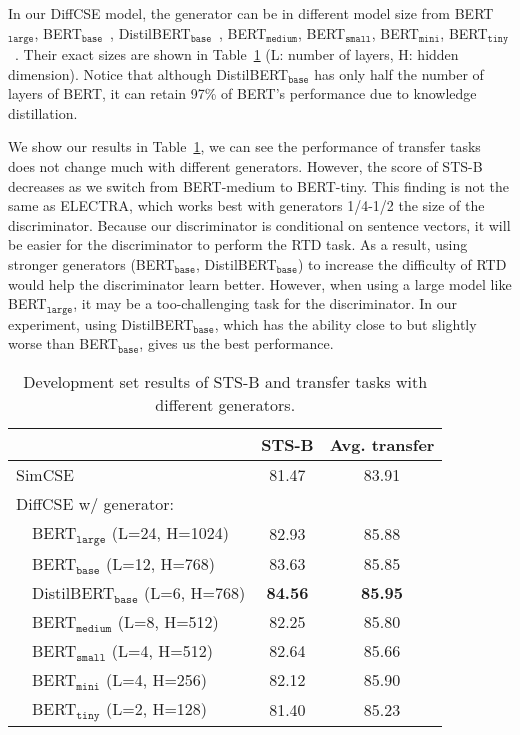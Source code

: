 \documentclass[11pt]{article}
\newcommand{\la}{$_\texttt{large}$\xspace}
\newcommand{\ba}{$_\texttt{base}$\xspace}
\newcommand\tf[1]{\textbf{#1}}
\begin{document}
In our DiffCSE model, the generator can be in different model size from BERT\la, BERT\ba~\cite{devlin2019bert}, DistilBERT\ba~\cite{sanh2019distilbert}, BERT$_\texttt{medium}$, BERT$_\texttt{small}$, BERT$_\texttt{mini}$, BERT$_\texttt{tiny}$~\cite{turc2019well}. Their exact sizes are shown in Table~\ref{tab:gsize} (L: number of layers, H: hidden dimension). Notice that although DistilBERT\ba has only half the number of layers of BERT, it can retain 97\% of BERT's performance due to knowledge distillation.

We show our results in Table~\ref{tab:gsize}, we can see the performance of transfer tasks does not change much with different generators. However, the score of STS-B decreases as we switch from BERT-medium to BERT-tiny. This finding is not the same as ELECTRA, which works best with generators 1/4-1/2 the size of the discriminator. Because our discriminator is conditional on sentence vectors, it will be easier for the discriminator to perform the RTD task. As a result, using stronger generators (BERT\ba, DistilBERT\ba) to increase the difficulty of RTD would help the discriminator learn better. However, when using a large model like BERT\la, it may be a too-challenging task for the discriminator. In our experiment, using DistilBERT\ba, which has the ability close to but slightly worse than BERT\ba, gives us the best performance.


\begin{table}[t!]
    \begin{center}
    \centering
    \small
    \begin{tabular}{lcc}
    \toprule
         & \tf{STS-B} & \tf{Avg. transfer} \\
    \midrule
        SimCSE & 81.47 & 83.91 \\
    \midrule
        DiffCSE w/ generator:& & \\
        ~~BERT$_\texttt{large}$ (L=24, H=1024) & 82.93 & 85.88 \\
        ~~BERT$_\texttt{base}$ (L=12, H=768) & 83.63 & 85.85 \\
        ~~DistilBERT$_\texttt{base}$ (L=6, H=768) & \bf 84.56 & \bf 85.95 \\
    \midrule
        ~~BERT$_\texttt{medium}$ (L=8, H=512) & 82.25 & 85.80 \\
        ~~BERT$_\texttt{small}$ (L=4, H=512)  & 82.64 & 85.66 \\
        ~~BERT$_\texttt{mini}$ (L=4, H=256) & 82.12 & 85.90 \\
        ~~BERT$_\texttt{tiny}$ (L=2, H=128) & 81.40 & 85.23 \\
    \bottomrule
    \end{tabular}
    \end{center}
\vspace{-3mm}
    \caption{
        Development set results of STS-B and transfer tasks with different generators. 
    }
    \label{tab:gsize}
    \vspace{-1mm}
\end{table}
\end{document}

